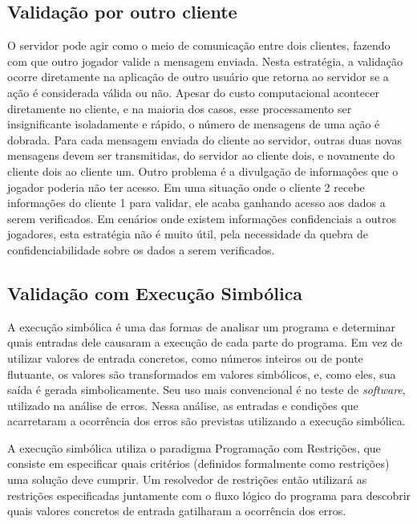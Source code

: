 \subsection{Validação por outro cliente}

O servidor pode agir como o meio de comunicação entre dois clientes, fazendo com que outro jogador valide a mensagem enviada. Nesta estratégia, a validação ocorre diretamente na aplicação de outro usuário que retorna ao servidor se a ação é considerada válida ou não. Apesar do custo computacional acontecer diretamente no cliente, e na maioria dos casos, esse processamento ser insignificante isoladamente e rápido, o número de mensagens de uma ação é dobrada. Para cada mensagem enviada do cliente ao servidor, outras duas novas mensagens devem ser transmitidas, do servidor ao cliente dois, e novamente do cliente dois ao cliente um. Outro problema é a divulgação de informações que o jogador poderia não ter acesso. Em uma situação onde o cliente 2 recebe informações do cliente 1 para validar, ele acaba ganhando acesso aos dados a serem verificados. Em cenários onde existem informações confidenciais a outros jogadores, esta estratégia não é muito útil, pela necessidade da quebra de confidenciabilidade sobre os dados a serem verificados.


\subsection{Validação com Execução Simbólica}

\label{simbolics}

A execução simbólica é uma das formas de analisar um programa e determinar quais entradas dele causaram a execução de cada parte do programa. Em vez de utilizar valores de entrada concretos, como números inteiros ou de ponte flutuante, os valores são transformados em valores simbólicos, e, como eles, sua saída é gerada simbolicamente. Seu uso mais convencional é no teste de \textit{software}, utilizado na análise de erros. Nessa análise, as entradas e condições que acarretaram a ocorrência dos erros são previstas utilizando a execução simbólica. 

A execução simbólica utiliza o paradigma Programação com Restrições, que consiste em especificar quais critérios (definidos formalmente como restrições) uma solução deve cumprir. Um resolvedor de restrições então utilizará as restrições especificadas juntamente com o fluxo lógico do programa para descobrir quais valores concretos de entrada gatilharam a ocorrência dos erros.

